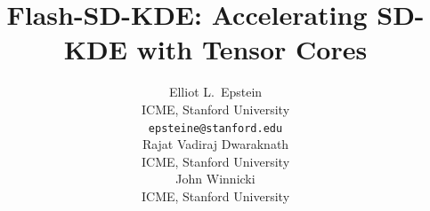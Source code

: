 \documentclass{article}
\title{Flash-SD-KDE: Accelerating SD-KDE with Tensor Cores}
\author{%
  Elliot L.\ Epstein\\
  ICME, Stanford University\\
  \texttt{epsteine@stanford.edu}\\
  \And
  Rajat Vadiraj Dwaraknath\\
  ICME, Stanford University\\
  \And
  John Winnicki\\
  ICME, Stanford University\\
}
\newif\ifarxiv
\newif\ifspigm
\newenvironment{revadded}{\begingroup\color{red}}{\endgroup}
\begin{document}
\ifspigm
\twocolumn[
  \icmltitle{Flash-SD-KDE: Accelerating SD-KDE with Tensor Cores}
  \begin{icmlauthorlist}
    \icmlauthor{Elliot L.\ Epstein}{stanford}
    \icmlauthor{Rajat Vadiraj Dwaraknath}{stanford}
    \icmlauthor{John Winnicki}{stanford}
  \end{icmlauthorlist}
  \icmlaffiliation{stanford}{ICME, Stanford University}
  \icmlcorrespondingauthor{Elliot L.\ Epstein}{epsteine@stanford.edu}
  \icmlkeywords{kernel density estimation, GPU kernels, SD-KDE}
  \vskip 0.3in
]
\printAffiliationsAndNotice{}
\else
\maketitle
\fi

\begin{abstract}

\end{abstract}










% 
% 

\ifspigm

\else

\fi


\ifarxiv

\fi



\ifspigm\else

\fi

\ifspigm\else
\clearpage

\fi
\end{document}
